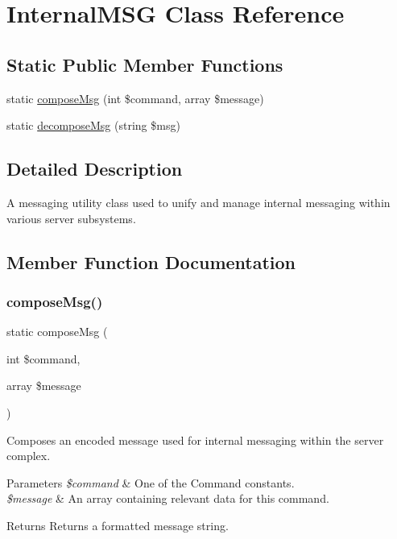 \hypertarget{class_internal_m_s_g}{}\section{Internal\+M\+SG Class Reference}
\label{class_internal_m_s_g}
\subsection*{Static Public Member Functions}
\begin{DoxyCompactItemize}
\item 
static \hyperlink{class_internal_m_s_g_ae3b91a7baffc1bef8eaeb4a5bcca65f0}{compose\+Msg} (int \$command, array \$message)
\item 
static \hyperlink{class_internal_m_s_g_ab515acd10479df5ff64b2584a2f8fa9d}{decompose\+Msg} (string \$msg)
\end{DoxyCompactItemize}


\subsection{Detailed Description}
A messaging utility class used to unify and manage internal messaging within various server subsystems. 

\subsection{Member Function Documentation}
\mbox{\label{class_internal_m_s_g_ae3b91a7baffc1bef8eaeb4a5bcca65f0}} 
\subsubsection{\texorpdfstring{compose\+Msg()}{composeMsg()}}
{\footnotesize\ttfamily static compose\+Msg (\begin{DoxyParamCaption}\item[{int}]{\$command,  }\item[{array}]{\$message }\end{DoxyParamCaption})\hspace{0.3cm}{\ttfamily [static]}}

Composes an encoded message used for internal messaging within the server complex. 
\begin{DoxyParams}{Parameters}
{\em \$command} & One of the Command constants. \\
\hline
{\em \$message} & An array containing relevant data for this command. \\
\hline
\end{DoxyParams}
\begin{DoxyReturn}{Returns}
Returns a formatted message string. 
\end{DoxyReturn}

